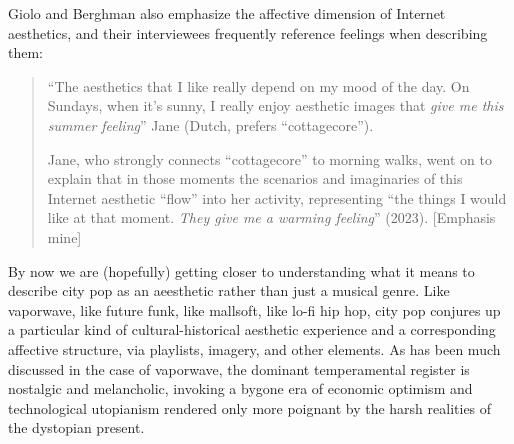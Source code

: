 \documentclass[
  letterpaper,
  DIV=11,
  numbers=noendperiod,
  oneside]{scrartcl}
\begin{document}
Giolo and Berghman also emphasize the affective dimension of Internet
aesthetics, and their interviewees frequently reference feelings when
describing them:

\begin{quote}
``The aesthetics that I like really depend on my mood of the day. On
Sundays, when it's sunny, I really enjoy aesthetic images that
\emph{give me this summer feeling}'' Jane (Dutch, prefers
``cottagecore'').

Jane, who strongly connects ``cottagecore'' to morning walks, went on to
explain that in those moments the scenarios and imaginaries of this
Internet aesthetic ``flow'' into her activity, representing ``the things
I would like at that moment. \emph{They give me a warming feeling}''
(2023). {[}Emphasis mine{]}
\end{quote}

By now we are (hopefully) getting closer to understanding what it means
to describe city pop as an aeesthetic rather than just a musical genre.
Like vaporwave, like future funk, like mallsoft, like lo-fi hip hop,
city pop conjures up a particular kind of cultural-historical aesthetic
experience and a corresponding affective structure, via playlists,
imagery, and other elements. As has been much discussed in the case of
vaporwave, the dominant temperamental register is nostalgic and
melancholic, invoking a bygone era of economic optimism and
technological utopianism rendered only more poignant by the harsh
realities of the dystopian present.
\end{document}
